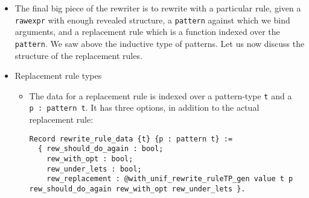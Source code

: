 \begin{itemize}
\tightlist
\item
  The final big piece of the rewriter is to rewrite with a particular
  rule, given a \texttt{rawexpr} with enough revealed structure, a
  \texttt{pattern} against which we bind arguments, and a replacement
  rule which is a function indexed over the \texttt{pattern}. We saw
  above the inductive type of patterns. Let us now discuss the structure
  of the replacement rules.
\item
  Replacement rule types

  \begin{itemize}
  \item
    The data for a replacement rule is indexed over a pattern-type
    \texttt{t} and a \texttt{p\ :\ pattern\ t}. It has three options, in
    addition to the actual replacement rule:

\begin{verbatim}
Record rewrite_rule_data {t} {p : pattern t} :=
  { rew_should_do_again : bool;
    rew_with_opt : bool;
    rew_under_lets : bool;
    rew_replacement : @with_unif_rewrite_ruleTP_gen value t p rew_should_do_again rew_with_opt rew_under_lets }.
\end{verbatim}


\end{itemize}
\end{itemize}
